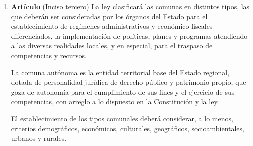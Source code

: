 \documentclass[11pt, a4paper]{article}
\begin{document}
\begin{enumerate}
\item \textbf{Artículo} \newline
(Inciso tercero) La ley clasificará las comunas en distintos tipos, las que deberán ser consideradas por los órganos del Estado para el establecimiento de regímenes administrativos y económico-fiscales diferenciados, la implementación de políticas, planes y programas atendiendo a las diversas realidades locales, y en especial, para el traspaso de competencias y recursos. 

La comuna autónoma es la entidad territorial base del Estado regional, dotada de personalidad jurídica de derecho público y patrimonio propio, que goza de autonomía para el cumplimiento de sus fines y el ejercicio de sus competencias, con arreglo a lo dispuesto en la Constitución y la ley. 

El establecimiento de los tipos comunales deberá considerar, a lo menos, criterios demográficos, económicos, culturales, geográficos, socioambientales, urbanos y rurales. 



\end{enumerate}
\end{document}
